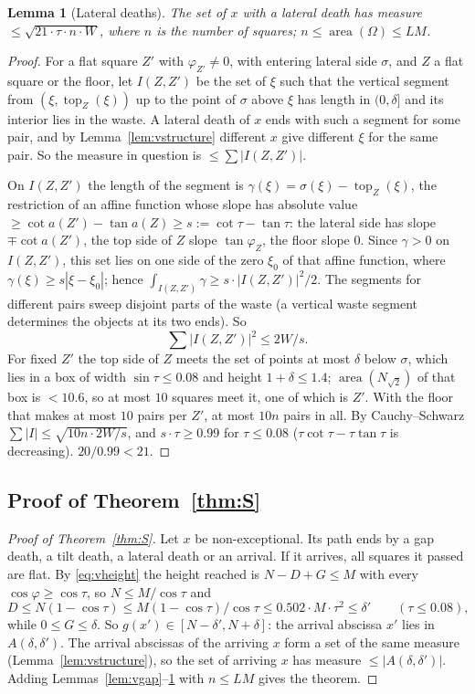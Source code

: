 \documentclass[11pt,letterpaper]{amsart}
\theoremstyle{plain}
\newtheorem{lemma}[theorem]{Lemma}
\theoremstyle{definition}
\theoremstyle{remark}
\begin{document}
\begin{lemma}[Lateral deaths]\label{lem:vlateral}
The set of $x$ with a lateral death has measure $\le\sqrt{21\cdot\tau\cdot n\cdot W}$, where $n$ is the number of squares; $n\le\operatorname{area}(\Omega)\le LM$.
\end{lemma}
\begin{proof}
For a flat square $Z'$ with $\varphi_{Z'}\ne0$, with entering lateral side $\sigma$, and $Z$ a flat square or the floor, let $I(Z,Z')$ be the set of $\xi$ such that the vertical segment from $(\xi,\operatorname{top}_Z(\xi))$ up to the point of $\sigma$ above $\xi$ has length in $(0,\delta]$ and its interior lies in the waste. A lateral death of $x$ ends with such a segment for some pair, and by Lemma~\ref{lem:vstructure} different $x$ give different $\xi$ for the same pair. So the measure in question is $\le\sum|I(Z,Z')|$.

On $I(Z,Z')$ the length of the segment is $\gamma(\xi)=\sigma(\xi)-\operatorname{top}_Z(\xi)$, the restriction of an affine function whose slope has absolute value $\ge\cot a(Z')-\tan a(Z)\ge s:=\cot\tau-\tan\tau$: the lateral side has slope $\mp\cot a(Z')$, the top side of $Z$ slope $\tan\varphi_Z$, the floor slope $0$. Since $\gamma>0$ on $I(Z,Z')$, this set lies on one side of the zero $\xi_0$ of that affine function, where $\gamma(\xi)\ge s|\xi-\xi_0|$; hence $\int_{I(Z,Z')}\gamma\ge s\cdot|I(Z,Z')|^2/2$. The segments for different pairs sweep disjoint parts of the waste (a vertical waste segment determines the objects at its two ends). So
\[
\sum|I(Z,Z')|^2\le2W/s.
\]
For fixed $Z'$ the top side of $Z$ meets the set of points at most $\delta$ below $\sigma$, which lies in a box of width $\sin\tau\le0.08$ and height $1+\delta\le1.4$; $\operatorname{area}(N_{\sqrt2})$ of that box is $<10.6$, so at most $10$ squares meet it, one of which is $Z'$. With the floor that makes at most $10$ pairs per $Z'$, at most $10n$ pairs in all. By Cauchy--Schwarz $\sum|I|\le\sqrt{10n\cdot2W/s}$, and $s\cdot\tau\ge0.99$ for $\tau\le0.08$ ($\tau\cot\tau-\tau\tan\tau$ is decreasing). $20/0.99<21$.
\end{proof}

\subsection{Proof of Theorem~\ref{thm:S}}\label{sec:proofS}
\begin{proof}[Proof of Theorem~\ref{thm:S}]
Let $x$ be non-exceptional. Its path ends by a gap death, a tilt death, a lateral death or an arrival. If it arrives, all squares it passed are flat. By \eqref{eq:vheight} the height reached is $N-D+G\le M$ with every $\cos\varphi\ge\cos\tau$, so $N\le M/\cos\tau$ and
\[
D\le N(1-\cos\tau)\le M(1-\cos\tau)/\cos\tau\le0.502\cdot M\cdot\tau^2\le\delta'\qquad(\tau\le0.08),
\]
while $0\le G\le\delta$. So $g(x')\in[N-\delta',N+\delta]$: the arrival abscissa $x'$ lies in $A(\delta,\delta')$. The arrival abscissas of the arriving $x$ form a set of the same measure (Lemma~\ref{lem:vstructure}), so the set of arriving $x$ has measure $\le|A(\delta,\delta')|$. Adding Lemmas~\ref{lem:vgap}--\ref{lem:vlateral} with $n\le LM$ gives the theorem.
\end{proof}
\end{document}
